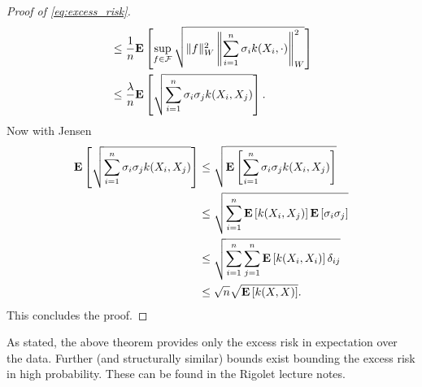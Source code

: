 \begin{proof}[Proof of \autoref{eq:excess_risk}]
\begin{align*}
	& \leq \frac{1}{n} \mathbf{E} \left[\sup_{f \in \mathcal{F}} \sqrt{\|f\|_W^2 \left\|\sum_{i=1}^n \sigma_i k(X_i, \cdot) \right\|_W^2}\right] \\ 
	& \leq \frac{\lambda}{n}\mathbf{E} \left[\sqrt{\sum_{i=1}^n \sigma_i\sigma_j k(X_i, X_j)}\right]. 
\end{align*}
Now with Jensen
\begin{align*}
	\mathbf{E} \left[\sqrt{\sum_{i=1}^n \sigma_i\sigma_j k(X_i, X_j)}\right] &\leq  \sqrt{\mathbf{E} \left[\sum_{i=1}^n \sigma_i\sigma_j k(X_i, X_j)\right]} \\ 
	&\leq  \sqrt{\sum_{i=1}^n \mathbf{E}\left[k(X_i, X_j)\right] \mathbf{E} \left[\sigma_i\sigma_j \right]} \\ 
	&\leq  \sqrt{\sum_{i=1}^n\sum_{j=1}^n\mathbf{E}\left[k(X_i, X_i)\right] \delta_{ij}} \\
	&\leq \sqrt{n}\sqrt{\mathbf{E}\left[k(X, X)\right]}.
\end{align*}
This concludes the proof.
\end{proof}
As stated, the above theorem provides only the excess risk in expectation over the data. Further (and structurally similar) bounds exist bounding the excess risk in high probability. These can be found in the Rigolet lecture notes. 
